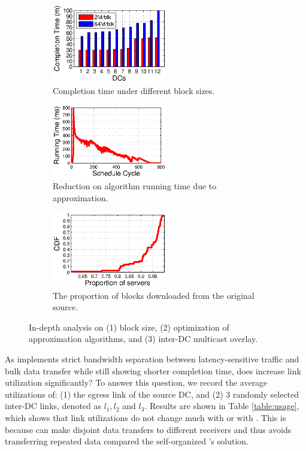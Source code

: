 \begin{figure}[t]
        \centering
        \begin{subfigure}[b]{0.3\textwidth}
                \centering
                \includegraphics[width=50mm]{images/blkSize.eps}
                \caption{Completion time under different block sizes.}
                \label{fig:analysis:blksize}
        \end{subfigure}
        \begin{subfigure}[b]{0.3\textwidth}
                \centering
                \includegraphics[width=50mm]{images/cycle.eps} %
                \caption{Reduction on algorithm running time due to approximation.}
                \label{fig:analysis:time}
        \end{subfigure}
        \begin{subfigure}[b]{0.3\textwidth}
                \centering
                \includegraphics[width=50mm]{images/overlay.eps}
                \caption{The proportion of blocks downloaded from the original source.}
                \label{fig:analysis:overlay}
        \end{subfigure}
        \caption{In-depth analysis on (1) block size, (2) optimization of approximation algorithms, and (3) inter-DC multicast overlay.}
        \label{fig:analysis}
\vspace{-0.4cm}
\end{figure}


As \name implements strict bandwidth separation between latency-sensitive traffic and bulk data transfer while still showing shorter completion time, does \name increase link utilization significantly? To answer this question, we record the average utilizations of: (1) the egress link of the source DC, and (2) 3 randomly selected inter-DC links, denoted as $l_1,l_2$ and $l_3$. Results are shown in Table \ref{table:usage}, which shows that link utilizations do not change much with \name or with \company. This is because \name can make disjoint data transfers to different receivers and thus avoids transferring repeated data compared the self-organized \company's solution.


